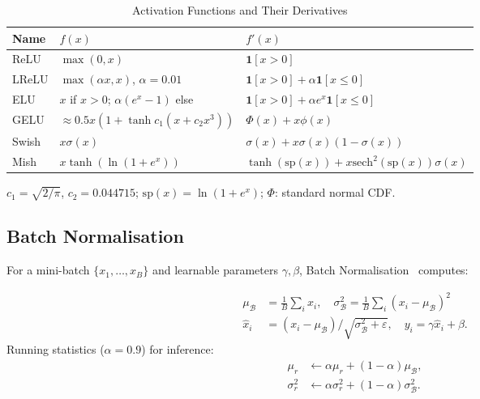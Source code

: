 \documentclass[10pt,conference,letterpaper]{IEEEtran}
\begin{document}
\begin{table}[h]
  \centering
  \caption{Activation Functions and Their Derivatives}
  \label{tab:activations}
  \renewcommand{\arraystretch}{1.2}
  \setlength{\tabcolsep}{4pt}
  \begin{tabular}{lll}
    \toprule
    \rowcolor{lightblue}
    \textbf{Name} & $f(x)$ & $f'(x)$ \\
    \midrule
    ReLU        & $\max(0,x)$ & $\mathbf{1}[x>0]$ \\
    \rowcolor{rowblue}
    LReLU       & $\max(\alpha x,x)$, $\alpha{=}0.01$ & $\mathbf{1}[x>0]+\alpha\mathbf{1}[x\le0]$ \\
    ELU         & $x$ if $x>0$; $\alpha(e^x{-}1)$ else & $\mathbf{1}[x>0]+\alpha e^x\mathbf{1}[x\le0]$ \\
    \rowcolor{rowblue}
    GELU        & $\approx 0.5x(1+\tanh c_1(x+c_2 x^3))$ & $\Phi(x)+x\phi(x)$ \\
    Swish       & $x\sigma(x)$ & $\sigma(x)+x\sigma(x)(1{-}\sigma(x))$ \\
    \rowcolor{rowblue}
    Mish        & $x\tanh(\ln(1+e^x))$ & $\tanh(\mathrm{sp}(x))+x\mathrm{sech}^2(\mathrm{sp}(x))\sigma(x)$ \\
    \bottomrule
  \end{tabular}
  \vspace{2pt}
  {\footnotesize $c_1{=}\sqrt{2/\pi}$, $c_2{=}0.044715$; $\mathrm{sp}(x){=}\ln(1+e^x)$; $\Phi$: standard normal CDF.}
\end{table}

\subsection{Batch Normalisation}
\label{sec:bn}

For a mini-batch $\{x_1,\ldots,x_B\}$ and learnable parameters $\gamma,\beta$,
Batch Normalisation~\cite{ioffe2015batchnorm} computes:
\begin{tcolorbox}[eqbox]
\begin{align}
  \mu_\mathcal{B}      &= \tfrac{1}{B}\textstyle\sum_i x_i,\quad
  \sigma^2_\mathcal{B}  = \tfrac{1}{B}\textstyle\sum_i(x_i-\mu_\mathcal{B})^2 \nonumber\\
  \hat{x}_i            &= (x_i-\mu_\mathcal{B})/\sqrt{\sigma^2_\mathcal{B}+\varepsilon},
  \quad y_i = \gamma\hat{x}_i+\beta. \label{eq:bn}
\end{align}
Running statistics ($\alpha=0.9$) for inference:
\begin{align}
  \mu_r      &\leftarrow \alpha\mu_r+(1-\alpha)\mu_\mathcal{B}, \nonumber\\
  \sigma^2_r &\leftarrow \alpha\sigma^2_r+(1-\alpha)\sigma^2_\mathcal{B}. \label{eq:bnrun}
\end{align}
\end{tcolorbox}
\end{document}
